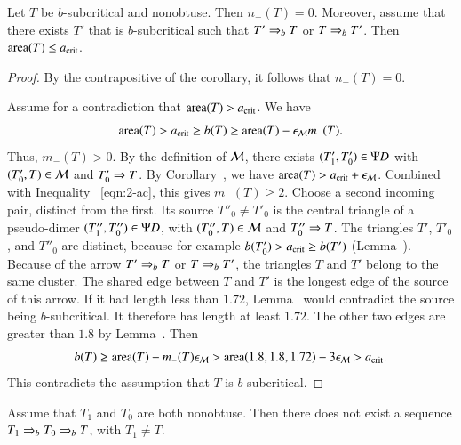 \begin{lemma}  
  Let $T$ be $b$-subcritical and nonobtuse.  Then $n_-(T)=0$.
  Moreover, assume that there exists $T'$ that is $b$-subcritical such
  that $T'\Rightarrow_{b} T$ or $T\Rightarrow_{b} T'$.  Then ${\operatorname{area}}(T)\le a_\text{crit}$.
\end{lemma}

\begin{proof}  
  By the contrapositive of the corollary, it follows that $n_-(T)=0$.

  Assume for a contradiction that ${\operatorname{area}}(T) > a_\text{crit}$.  We have
\begin{equation}\libel{eqn:2-ac}
\area(T) > \acrit \ge b(T) \ge \area(T) - \epsM m_-(T).
\end{equation}
Thus, $m_-(T) >0$.  By the definition of $\mathcal M$, there exists
$(T'_1,T'_0)\in\Psi D$ with $(T'_0,T)\in\mathcal M$ and $T'_0\Rightarrow T$.  By
Corollary~, we have ${\operatorname{area}}(T) >
a_\text{crit}+\epsilon_{\mathcal M}$. Combined with Inequality ~\eqref{eqn:2-ac}, this gives
$m_-(T)\ge 2$.  Choose a second incoming pair, distinct from the
first.  Its source $T''_0\ne T'_0$ is the central triangle of a
pseudo-dimer $(T''_1,T''_0)\in\Psi D$, with $(T''_0,T)\in\mathcal M$ and
$T''_0\Rightarrow T$.  The triangles $T'$, $T'_0$,
and $T''_0$ are distinct, because for example $b(T'_0) > a_\text{crit} \ge
b(T')$ (Lemma~).  Because of the arrow $T'\Rightarrow_{b} T$ or $T\Rightarrow_{b}
T'$, the triangles $T$ and $T'$ belong to the same cluster.  The
shared edge between $T$ and $T'$ is the longest edge of the source
of this arrow.  If it had length less than $1.72$,
Lemma~ would contradict the source being
$b$-subcritical.  It therefore has length at least $1.72$.  The
other two edges are greater than $1.8$ by
Lemma~.  Then
\[
b(T) \ge {\operatorname{area}}(T) - m_-(T)\epsilon_{\mathcal M} > {\operatorname{area}}(1.8,1.8,1.72) - 3\epsilon_{\mathcal M} > a_\text{crit}.
\]
This  contradicts the assumption that $T$ is $b$-subcritical.
\end{proof}

\begin{lemma}  Assume that $T_1$ and $T_0$
  are both nonobtuse.  Then there does not exist a sequence $T_1\Rightarrow_{b}
  T_0 \Rightarrow_{b} T$, with $T_1\ne T$.
\end{lemma}

